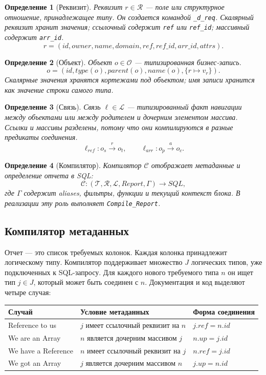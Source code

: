 \documentclass[11pt]{article}
\newtheorem{definition}{Определение}
\begin{document}
\begin{definition}[Реквизит]
Реквизит \(r \in \mathcal{R}\) --- поле или структурное отношение, принадлежащее
типу. Он создается командой \texttt{\_d\_req}. Скалярный реквизит хранит
значения; ссылочный содержит \texttt{ref} или \texttt{ref\_id}; массивный
содержит \texttt{arr\_id}.
\[
  r = (id, owner, name, domain, ref, ref\_id, arr\_id, attrs).
\]
\end{definition}

\begin{definition}[Объект]
Объект \(o \in \mathcal{O}\) --- типизированная бизнес-запись.
\[
  o = (id, type(o), parent(o), name(o), \{r \mapsto v_r\}).
\]
Скалярные значения хранятся кортежами под объектом; имя записи хранится как
значение строки самого типа.
\end{definition}

\begin{definition}[Связь]
Связь \(\ell \in \mathcal{L}\) --- типизированный факт навигации между
объектами или между родителем и дочерним элементом массива. Ссылки и массивы
разделены, потому что они компилируются в разные предикаты соединения.
\[
  \ell_{ref}: o_s \xrightarrow{r} o_t,\qquad
  \ell_{arr}: o_p \xrightarrow{a} o_c.
\]
\end{definition}

\begin{definition}[Компилятор]
Компилятор \(\mathcal{C}\) отображает метаданные и определение отчета в SQL:
\[
  \mathcal{C}: (\mathcal{T},\mathcal{R},\mathcal{L}, Report, \Gamma)
  \rightarrow SQL ,
\]
где \(\Gamma\) содержит aliases, фильтры, функции и текущий контекст блока. В
реализации эту роль выполняет \texttt{Compile\_Report}.
\end{definition}

\subsection{Компилятор метаданных}

Отчет --- это список требуемых колонок. Каждая колонка принадлежит логическому
типу. Компилятор поддерживает множество \(J\) логических типов, уже подключенных
к SQL-запросу. Для каждого нового требуемого типа \(n\) он ищет тип
\(j \in J\), который может быть соединен с \(n\). Документация и код выделяют
четыре случая:

\begin{center}
\begin{tabular}{lll}
\toprule
Случай & Условие метаданных & Форма соединения \\
\midrule
Reference to us & \(j\) имеет ссылочный реквизит на \(n\) &
\(j.ref = n.id\) \\
We are an Array & \(n\) является дочерним массивом \(j\) &
\(n.up = j.id\) \\
We have a Reference & \(n\) имеет ссылочный реквизит на \(j\) &
\(n.ref = j.id\) \\
We got an Array & \(j\) является дочерним массивом \(n\) &
\(j.up = n.id\) \\
\bottomrule
\end{tabular}
\end{center}
\end{document}
